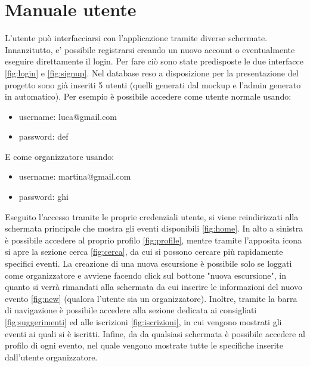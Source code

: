 \section{Manuale utente}
L'utente può interfacciarsi con l'applicazione tramite diverse schermate. Innanzitutto, e' possibile registrarsi creando un nuovo account o eventualmente eseguire direttamente il login. Per fare ciò sono state predisposte le due interfacce \ref{fig:login} e \ref{fig:signup}. Nel database reso a disposizione per la presentazione del progetto sono già inseriti 5 utenti (quelli generati dal mockup e l'admin generato in automatico). Per esempio è possibile accedere come utente normale usando:
\begin{itemize}
    \item username: luca@gmail.com
    \item password: def
\end{itemize}
E come organizzatore usando:
\begin{itemize}
    \item username: martina@gmail.com
    \item password: ghi
\end{itemize}
Eseguito l'accesso tramite le proprie credenziali utente, si viene reindirizzati alla schermata principale che mostra gli eventi disponibili \ref{fig:home}. In alto a sinistra è possibile accedere al proprio profilo \ref{fig:profile}, mentre tramite l'apposita icona si apre la sezione cerca \ref{fig:cerca}, da cui si possono cercare più rapidamente specifici eventi. La creazione di una nuova escursione è possibile solo se loggati come organizzatore e avviene facendo click sul bottone "nuova escursione", in quanto si verrà rimandati alla schermata  da cui inserire le informazioni del nuovo evento \ref{fig:new} (qualora l'utente sia un organizzatore). Inoltre, tramite la barra di navigazione è possibile accedere alla sezione dedicata ai consigliati \ref{fig:suggerimenti} ed alle iscrizioni \ref{fig:iscrizioni}, in cui vengono mostrati gli eventi ai quali si è iscritti. Infine, da da qualsiasi schermata è possibile accedere al profilo di ogni evento, nel quale vengono mostrate tutte le specifiche inserite
dall'utente organizzatore.

